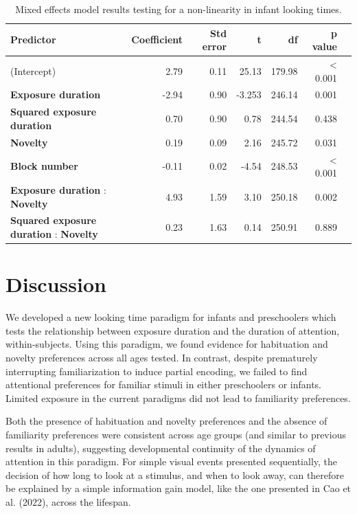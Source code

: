 \documentclass[10pt, letterpaper]{article}
\begin{document}
\begin{table}[t]
\centering
\begin{tabular}{lrrrrrr}
  \hline
 Predictor & Coefficient & Std error & t & df & p value \\ 
  \hline
(Intercept) & 2.79 & 0.11 & 25.13 & 179.98 & \textless{ 0.001} \\ 
  \textbf{Exposure duration} & -2.94 & 0.90 & -3.253 & 246.14 & 0.001 \\ 
  \textbf{Squared exposure duration} & 0.70 & 0.90 & 0.78 & 244.54 & 0.438 \\ 
  \textbf{Novelty} & 0.19 & 0.09 & 2.16 & 245.72 & 0.031 \\ 
  \textbf{Block number} & -0.11 & 0.02 & -4.54 & 248.53 & \textless{ 0.001} \\ 
  \textbf{Exposure duration} : \textbf{Novelty} & 4.93 & 1.59 & 3.10 & 250.18 & 0.002 \\ 
  \textbf{Squared exposure duration} : \textbf{Novelty} & 0.23 & 1.63 & 0.14 & 250.91 & 0.889 \\ 
   \hline
\end{tabular}
\caption{Mixed effects model results testing for a non-linearity in infant looking times.}\label{wrap-tab:1}
\end{table}

\hypertarget{discussion}{%
\section{Discussion}\label{discussion}}

We developed a new looking time paradigm for infants and preschoolers
which tests the relationship between exposure duration and the duration
of attention, within-subjects. Using this paradigm, we found evidence
for habituation and novelty preferences across all ages tested. In
contrast, despite prematurely interrupting familiarization to induce
partial encoding, we failed to find attentional preferences for familiar
stimuli in either preschoolers or infants. Limited exposure in the
current paradigms did not lead to familiarity preferences.

Both the presence of habituation and novelty preferences and the absence
of familiarity preferences were consistent across age groups (and
similar to previous results in adults), suggesting developmental
continuity of the dynamics of attention in this paradigm. For simple
visual events presented sequentially, the decision of how long to look
at a stimulus, and when to look away, can therefore be explained by a
simple information gain model, like the one presented in Cao et al.
(2022), across the lifespan.
\end{document}
